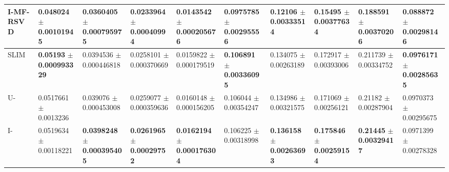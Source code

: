 \documentclass{article}
\begin{document}
\begin{table*} [!htb]
{\begin{tabular}{l|llll|llll|l}
		 I-MF-RSVD &  \num{0.048024} $\pm$ \num{0.00101945}&\num{0.0360405} $\pm$ \num{0.000795975}&\num{0.0233964} $\pm$ \num{0.00040994}&\num{0.0143542} $\pm$ \num{0.000205676}&\num{0.0975785} $\pm$ \num{0.00295556}&\num{0.12106} $\pm$ \num{0.00333514}&\num{0.15495} $\pm$ \num{0.00377634}&\num{0.188591} $\pm$ \num{0.00370206}&\num{0.088872} $\pm$ \num{0.00298146}\\
		 \hline
		 SLIM & \textbf{\num{0.05193}} $\pm$ \textbf{\num{0.000993329}} &\num{0.0394536} $\pm$ \num{0.000446818}&\num{0.0258101} $\pm$ \num{0.000370669}&\num{0.0159822} $\pm$ \num{0.000179519}& \textbf{\num{0.106891}} $\pm$ \textbf{\num{0.00336095}} & \num{0.134075} $\pm$ \num{0.00263189}&\num{0.172917} $\pm$ \num{0.00393006}&\num{0.211739} $\pm$ \num{0.00334752}& \textbf{\num{0.0976171}} $\pm$ \textbf{\num{0.00285635}}\\

		U-\LinearLow &  \num{0.0517661} $\pm$ \num{0.0013236}&\num{0.039076} $\pm$ \num{0.000453008}&\num{0.0259077} $\pm$ \num{0.000359636}&\num{0.0160148} $\pm$ \num{0.000156205}&\num{0.106044} $\pm$ \num{0.00354247}&\num{0.134986} $\pm$ \num{0.00321575}&\num{0.171069} $\pm$ \num{0.00256121}&\num{0.21182} $\pm$ \num{0.00287904}&\num{0.0970373} $\pm$ \num{0.00295675}\\

		I-\LinearLow &  \num{0.0519634} $\pm$ \num{0.00118221}& \textbf{\num{0.0398248}} $\pm$ \textbf{\num{0.000395405}}&\textbf{\num{0.0261965}} $\pm$ \textbf{\num{0.00029752}}&\textbf{\num{0.0162194}} $\pm$ \textbf{\num{0.000176304}} &\num{0.106225} $\pm$ \num{0.00318998}&\textbf{\num{0.136158}} $\pm$ \textbf{\num{0.00263693}}& \textbf{\num{0.175846}} $\pm$ \textbf{\num{0.00259154}}&\textbf{\num{0.21445}} $\pm$ \textbf{\num{0.00329417}}&\num{0.0971399} $\pm$ \num{0.00278328} \\


		\hline
	\end{tabular}
}

\end{table*}
\end{document}
